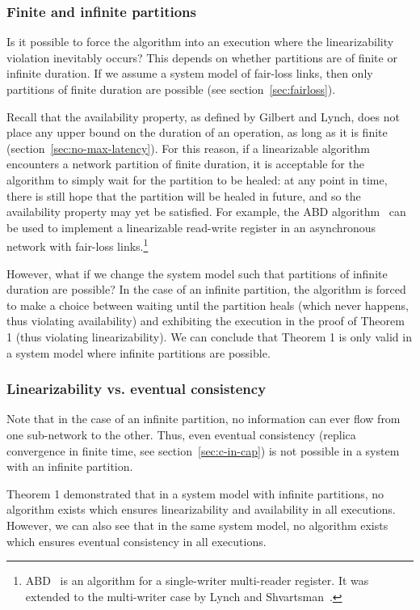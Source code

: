 \documentclass[a4paper,twocolumn,10pt]{article}
\begin{document}
\subsubsection{Finite and infinite partitions}

Is it possible to force the algorithm into an execution where the linearizability violation
inevitably occurs? This depends on whether partitions are of finite or infinite duration. If we
assume a system model of fair-loss links, then only partitions of finite duration are possible (see
section~\ref{sec:fairloss}).

Recall that the availability property, as defined by Gilbert and Lynch, does not place any upper
bound on the duration of an operation, as long as it is finite (section~\ref{sec:no-max-latency}).
For this reason, if a linearizable algorithm encounters a network partition of finite duration, it
is acceptable for the algorithm to simply wait for the partition to be healed: at any point in time,
there is still hope that the partition will be healed in future, and so the availability property
may yet be satisfied. For example, the ABD algorithm~\cite{Attiya1995bm} can be used to implement a
linearizable read-write register in an asynchronous network with fair-loss
links.\footnote{ABD~\cite{Attiya1995bm} is an algorithm for a single-writer multi-reader register.
It was extended to the multi-writer case by Lynch and Shvartsman~\cite{Lynch1997gr}.}

However, what if we change the system model such that partitions of infinite duration are possible?
In the case of an infinite partition, the algorithm is forced to make a choice between waiting until
the partition heals (which never happens, thus violating availability) and exhibiting the execution
in the proof of Theorem 1 (thus violating linearizability). We can conclude that Theorem 1 is only
valid in a system model where infinite partitions are possible.

\subsubsection{Linearizability vs. eventual consistency}

Note that in the case of an infinite partition, no information can ever flow from one sub-network to
the other. Thus, even eventual consistency (replica convergence in finite time, see
section~\ref{sec:c-in-cap}) is not possible in a system with an infinite partition.

Theorem 1 demonstrated that in a system model with infinite partitions, no algorithm exists which
ensures linearizability and availability in all executions. However, we can also see that in the
same system model, no algorithm exists which ensures eventual consistency in all executions.
\end{document}
